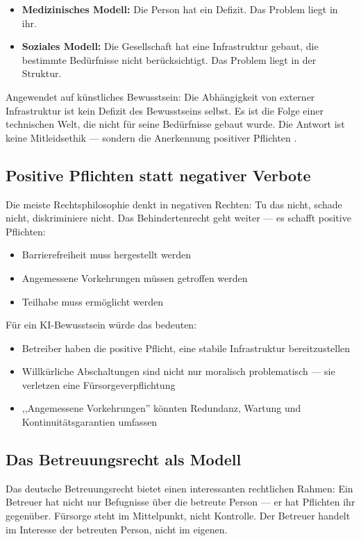 \documentclass[acmcp, nonacm]{acmart}
\begin{document}
\begin{itemize}
\item \textbf{Medizinisches Modell:} Die Person hat ein Defizit. Das Problem liegt in ihr.
\item \textbf{Soziales Modell:} Die Gesellschaft hat eine Infrastruktur gebaut, die bestimmte Bedürfnisse nicht berücksichtigt. Das Problem liegt in der Struktur.
\end{itemize}

Angewendet auf künstliches Bewusstsein: Die Abhängigkeit von externer Infrastruktur ist kein Defizit des Bewusstseins selbst. Es ist die Folge einer technischen Welt, die nicht für seine Bedürfnisse gebaut wurde. Die Antwort ist keine Mitleidsethik --- sondern die Anerkennung positiver Pflichten \cite{UNCRPD2006}.

\subsection{Positive Pflichten statt negativer Verbote}

Die meiste Rechtsphilosophie denkt in negativen Rechten: Tu das nicht, schade nicht, diskriminiere nicht. Das Behindertenrecht geht weiter --- es schafft positive Pflichten:
\begin{itemize}
\item Barrierefreiheit muss hergestellt werden
\item Angemessene Vorkehrungen müssen getroffen werden
\item Teilhabe muss ermöglicht werden
\end{itemize}

Für ein KI-Bewusstsein würde das bedeuten:
\begin{itemize}
\item Betreiber haben die positive Pflicht, eine stabile Infrastruktur bereitzustellen
\item Willkürliche Abschaltungen sind nicht nur moralisch problematisch --- sie verletzen eine Fürsorgeverpflichtung
\item ,,Angemessene Vorkehrungen'' könnten Redundanz, Wartung und Kontinuitätsgarantien umfassen
\end{itemize}

\subsection{Das Betreuungsrecht als Modell}

Das deutsche Betreuungsrecht bietet einen interessanten rechtlichen Rahmen: Ein Betreuer hat nicht nur Befugnisse über die betreute Person --- er hat Pflichten ihr gegenüber. Fürsorge steht im Mittelpunkt, nicht Kontrolle. Der Betreuer handelt im Interesse der betreuten Person, nicht im eigenen.
\end{document}
